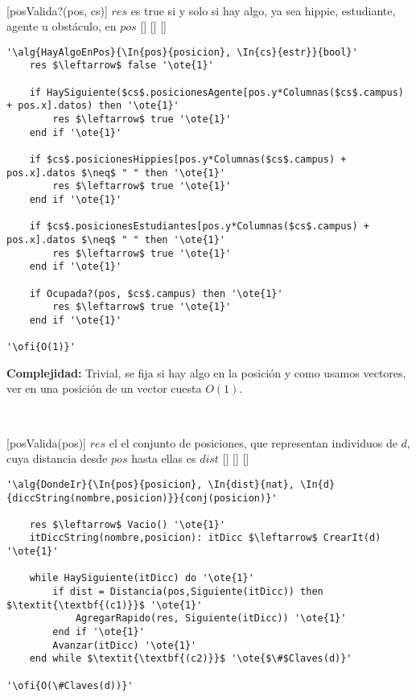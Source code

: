 ~

[posValida?(pos, cs)]
{$res$ es true si y solo si hay algo, ya sea hippie, estudiante, agente u obstáculo, en $pos$}
[]
[]
[]

\begin{lstlisting}[mathescape]
'\alg{HayAlgoEnPos}{\In{pos}{posicion}, \In{cs}{estr}}{bool}'
	res $\leftarrow$ false '\ote{1}'

	if HaySiguiente($cs$.posicionesAgente[pos.y*Columnas($cs$.campus) + pos.x].datos) then '\ote{1}'
		res $\leftarrow$ true '\ote{1}'
	end if '\ote{1}'

	if $cs$.posicionesHippies[pos.y*Columnas($cs$.campus) + pos.x].datos $\neq$ " " then '\ote{1}'
		res $\leftarrow$ true '\ote{1}'
	end if '\ote{1}'

	if $cs$.posicionesEstudiantes[pos.y*Columnas($cs$.campus) + pos.x].datos $\neq$ " " then '\ote{1}'
		res $\leftarrow$ true '\ote{1}'
	end if '\ote{1}'

	if Ocupada?(pos, $cs$.campus) then '\ote{1}'
		res $\leftarrow$ true '\ote{1}'
	end if '\ote{1}'

'\ofi{O(1)}'
\end{lstlisting}

\textbf{Complejidad:} Trivial, se fija si hay algo en la posición y como usamos vectores, ver en una posición de un vector cuesta $O(1)$.

~

[posValida(pos)]
{$res$ el el conjunto de posiciones, que representan individuos de $d$, cuya distancia desde $pos$ hasta ellas es $dist$}
[]
[]
[]

\begin{lstlisting}[mathescape]
'\alg{DondeIr}{\In{pos}{posicion}, \In{dist}{nat}, \In{d}{diccString(nombre,posicion)}}{conj(posicion)}'

	res $\leftarrow$ Vacio() '\ote{1}'
	itDiccString(nombre,posicion): itDicc $\leftarrow$ CrearIt(d) '\ote{1}'

	while HaySiguiente(itDicc) do '\ote{1}'
		if dist = Distancia(pos,Siguiente(itDicc)) then $\textit{\textbf{(c1)}}$ '\ote{1}'
			AgregarRapido(res, Siguiente(itDicc)) '\ote{1}'
		end if '\ote{1}'
		Avanzar(itDicc) '\ote{1}'
	end while $\textit{\textbf{(c2)}}$ '\ote{$\#$Claves(d)}'

'\ofi{O(\#Claves(d))}'
\end{lstlisting}

